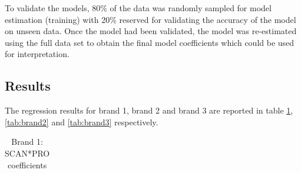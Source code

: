 \documentclass[a4paper,11pt]{article}
\begin{document}
To validate the models, 80\% of the data was randomly sampled for model estimation (training) with 20\% reserved for validating the accuracy of the model on unseen data. Once the model had been validated, the model was re-estimated using the full data set to obtain the final model coefficients which could be used for interpretation.



\subsection{Results}
The regression results for brand 1, brand 2 and brand 3 are reported in table \ref{tab:brand1}, \ref{tab:brand2} and \ref{tab:brand3} respectively.

\newpage
\begin{center}
\begin{table}
\caption{Brand 1: SCAN*PRO coefficients}\label{tab:brand1}
\begin{tabular}{lclc}


\end{tabular}
\end{table}
\end{center}
\end{document}
